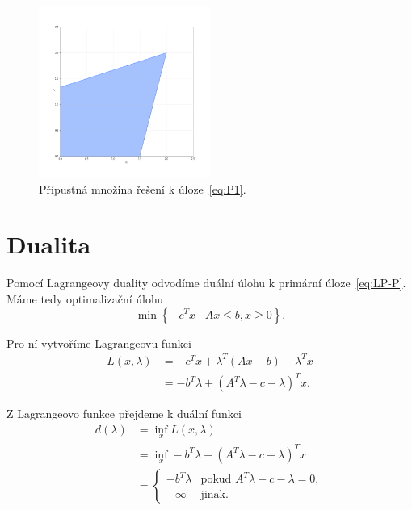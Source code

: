 \begin{figure}[h!]
    \centering
    \includegraphics[width=0.5\textwidth]{img/ex1.png}   
    \caption{Přípustná množina řešení k úloze~\ref{eq:P1}.}
    \label{fig:ex1}
\end{figure}

\section{Dualita}

Pomocí Lagrangeovy duality odvodíme duální úlohu k primární úloze~\ref{eq:LP-P}. Máme tedy optimalizační úlohu
\begin{equation*}
    \min \left\{ -c^Tx \mid Ax \leq b, x \geq 0 \right\}.
\end{equation*}

\noindent Pro ní vytvoříme Lagrangeovu funkci
\begin{equation*}
    \begin{split}
        L(x, \lambda) &= -c^Tx + \lambda^T \left( Ax - b \right) - \lambda^Tx \\
                      &= -b^T\lambda + \left( A^T\lambda - c - \lambda \right)^Tx.
    \end{split}
\end{equation*}

\noindent Z Lagrangeovo funkce přejdeme k duální funkci
\begin{equation*}
    \begin{split}
        d(\lambda)  &= \inf_x L(x, \lambda) \\
                    &= \inf_x -b^T\lambda + \left( A^T\lambda - c - \lambda \right)^Tx \\
                    &=
                    \begin{cases}
                        -b^T\lambda & \text{pokud } A^T\lambda - c - \lambda = 0, \\
                        -\infty     & \text{jinak}.
                    \end{cases}
    \end{split}
\end{equation*}

